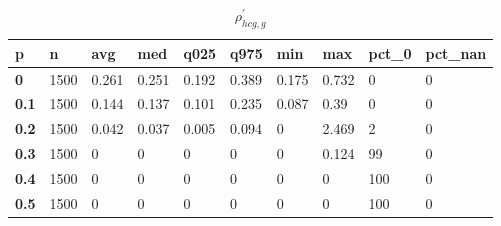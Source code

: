 \begin{table}[h]
 \centering 
\footnotesize
\caption{$\rho_{hcg,g}^\prime $}
\label{tab:alphahcgg}
\begin{tabular}[h]{|l|l|l|l|l|l|l|l|l|l|
    } \hline
\textbf{ p} & \textbf{ n} & \textbf{ avg} & \textbf{ med} & \textbf{ q025} & \textbf{ q975} & \textbf{ min} & \textbf{ max} & \textbf{ pct\_0} & \textbf{ pct\_nan}
    \\ \hline
  \textbf{  0} & 1500 & 0.261 & 0.251 & 0.192 & 0.389 & 0.175 & 0.732 &   0 & 0
    \\ \hline
  \textbf{0.1} & 1500 & 0.144 & 0.137 & 0.101 & 0.235 & 0.087 &  0.39 &   0 & 0
    \\ \hline
  \textbf{0.2} & 1500 & 0.042 & 0.037 & 0.005 & 0.094 &     0 & 2.469 &   2 & 0
    \\ \hline
  \textbf{0.3} & 1500 &     0 &     0 &     0 &     0 &     0 & 0.124 &  99 & 0
    \\ \hline
  \textbf{0.4} & 1500 &     0 &     0 &     0 &     0 &     0 &     0 & 100 & 0
    \\ \hline
  \textbf{0.5} & 1500 &     0 &     0 &     0 &     0 &     0 &     0 & 100 & 0
    \\ \hline
 \end{tabular}
 \end{table}
